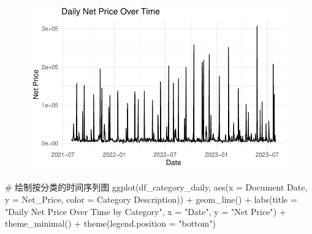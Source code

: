 \documentclass[
  letterpaper,
  DIV=11,
  numbers=noendperiod]{scrartcl}
\newenvironment{Shaded}{\begin{snugshade}}{\end{snugshade}}
\newcommand{\AttributeTok}[1]{\textcolor[rgb]{0.40,0.45,0.13}{#1}}
\newcommand{\CommentTok}[1]{\textcolor[rgb]{0.37,0.37,0.37}{#1}}
\newcommand{\FunctionTok}[1]{\textcolor[rgb]{0.28,0.35,0.67}{#1}}
\newcommand{\NormalTok}[1]{\textcolor[rgb]{0.00,0.23,0.31}{#1}}
\newcommand{\SpecialCharTok}[1]{\textcolor[rgb]{0.37,0.37,0.37}{#1}}
\newcommand{\StringTok}[1]{\textcolor[rgb]{0.13,0.47,0.30}{#1}}
\begin{document}
\begin{figure}[H]

{\centering \includegraphics{Time-Serise-EDA_files/figure-pdf/unnamed-chunk-2-1.pdf}

}

\end{figure}

\begin{Shaded}
\begin{Highlighting}[]
\CommentTok{\# 绘制按分类的时间序列图}
\FunctionTok{ggplot}\NormalTok{(df\_category\_daily, }\FunctionTok{aes}\NormalTok{(}\AttributeTok{x =} \StringTok{\textasciigrave{}}\AttributeTok{Document Date}\StringTok{\textasciigrave{}}\NormalTok{, }\AttributeTok{y =}\NormalTok{ Net\_Price, }\AttributeTok{color =} \StringTok{\textasciigrave{}}\AttributeTok{Category Description}\StringTok{\textasciigrave{}}\NormalTok{)) }\SpecialCharTok{+}
  \FunctionTok{geom\_line}\NormalTok{() }\SpecialCharTok{+}
  \FunctionTok{labs}\NormalTok{(}\AttributeTok{title =} \StringTok{"Daily Net Price Over Time by Category"}\NormalTok{,}
       \AttributeTok{x =} \StringTok{"Date"}\NormalTok{, }\AttributeTok{y =} \StringTok{"Net Price"}\NormalTok{) }\SpecialCharTok{+}
  \FunctionTok{theme\_minimal}\NormalTok{() }\SpecialCharTok{+}
  \FunctionTok{theme}\NormalTok{(}\AttributeTok{legend.position =} \StringTok{"bottom"}\NormalTok{)}
\end{Highlighting}
\end{Shaded}
\end{document}
